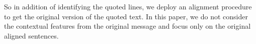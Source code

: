 So in addition of identifying the quoted lines, we deploy an alignment procedure to get the original version of the quoted text. 
In this paper, we do not consider the contextual features from the original message and focus only on the original aligned sentences. 
















